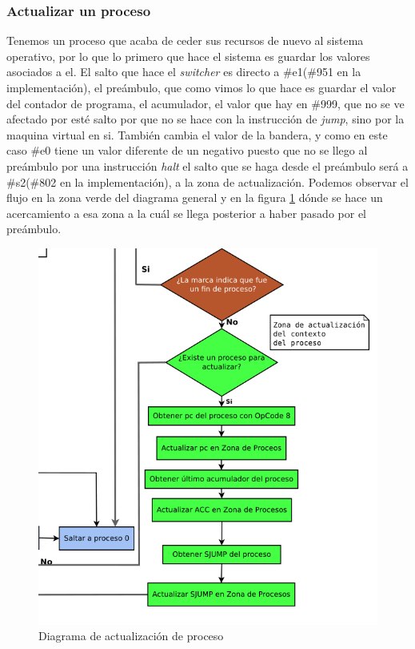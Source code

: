 \documentclass[letterpaper,12pt,oneside]{book}
\begin{document}
		\clearpage		

		\subsubsection{Actualizar un proceso}
		
		Tenemos un proceso que acaba de ceder sus recursos de nuevo al sistema operativo, por lo que lo primero que hace el sistema es guardar los
		valores asociados a el. El salto que hace el \textit{switcher} es directo a \#e1(\#951 en la implementación), el preámbulo, que como vimos lo que hace es guardar
		el valor del contador de programa, el acumulador, el valor que hay en \#999, que no se ve afectado por esté salto por que no se hace
		con la instrucción de \textit{jump}, sino por la maquina virtual en si. También cambia el valor de la bandera, y como en este caso
		\#e0 tiene un valor diferente de un negativo puesto que no se llego al preámbulo por una instrucción \textit{halt}
		el salto que se haga desde el preámbulo será a \#s2(\#802 en la implementación), a la zona de actualización. Podemos observar
		el flujo en la zona verde del diagrama general y en la figura \ref{fig:diagActualProccess1} dónde se hace un acercamiento a esa zona
		a la cuál se llega posterior a haber pasado por el preámbulo.
		
		\begin{figure}[ht]		
			\centering
			\includegraphics[scale=0.6]{media/CARDIACC/DiagActualizacionProcess.png}
			\caption{ Diagrama de actualización de proceso}
			\label{fig:diagActualProccess1}
		\end{figure}		
		
\end{document}

